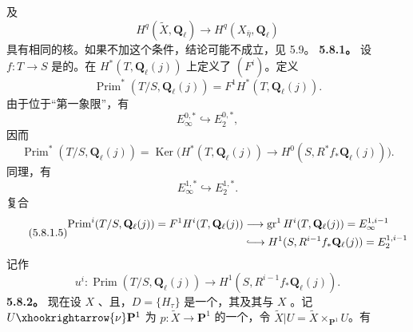 及
\begin{equation}\tag{5.7.12}H^q(\widetilde X,\mathbf Q_\ell)\longrightarrow H^q(X_{\bar\eta},\mathbf Q_\ell)\end{equation}
具有相同的核。如果不加这个条件，结论可能不成立，见 5.9。
\textbf{5.8.1。} 设 $f:T\to S$ 是的。在 $H^*(T,\mathbf Q_\ell(j))$ 上定义了 $(F^i)$。定义
\begin{equation}\tag{5.8.1.1}\operatorname{Prim}^*(T/S,\mathbf Q_\ell(j))=F^1H^*(T,\mathbf Q_\ell(j)).\end{equation}
由于位于“第一象限”，有
\begin{equation}\tag{5.8.1.2}E_\infty^{0,*}\hookrightarrow E_2^{0,*},\end{equation}
因而
\begin{equation}\tag{5.8.1.3}\operatorname{Prim}^*(T/S,\mathbf Q_\ell(j))=\operatorname{Ker}\bigl(H^*(T,\mathbf Q_\ell(j))\to H^0(S,R^*f_*\mathbf Q_\ell(j))\bigr).\end{equation}
同理，有
\begin{equation}\tag{5.8.1.4}E_\infty^{1,*}\hookrightarrow E_2^{1,*}.\end{equation}
复合
\begin{equation}\tag{5.8.1.5}\begin{aligned}
\operatorname{Prim}^i(T/S,\mathbf Q_\ell(j))=F^1H^i(T,\mathbf Q_\ell(j))&\longrightarrow\operatorname{gr}^1H^i(T,\mathbf Q_\ell(j))=E_\infty^{1,i-1}\\
&\lhook\joinrel\longrightarrow H^1(S,R^{i-1}f_*\mathbf Q_\ell(j))=E_2^{1,i-1}
\end{aligned}\end{equation}
记作
\begin{equation}\tag{5.8.1.6}u^i:\operatorname{Prim}(T/S,\mathbf Q_\ell(j))\longrightarrow H^1(S,R^{i-1}f_*\mathbf Q_\ell(j)).\end{equation}
\textbf{5.8.2。} 现在设 $X$ 、且，$D=\{H_\tau\}$ 是一个，其及其与 $X$ 。记 $U\xhookrightarrow{\nu}\mathbf P^1$ 为 $p:\widetilde X\to\mathbf P^1$ 的一个，令 $\widetilde X|U=\widetilde X\times_{\mathbf P^1}U$。有
